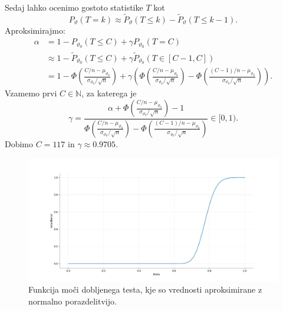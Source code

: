 \documentclass[ letterpaper, titlepage, fleqn]{article}
\newcommand{\N}{\mathbb N}
\begin{document}
Sedaj lahko ocenimo gostoto statistike $T$ kot
$$P_\vartheta(T = k) \approx \tilde{P}_\vartheta(T \leq k) - \tilde{P}_\vartheta(T \leq k-1).$$
Aproksimirajmo:
\begin{equation*}
\begin{aligned}
\alpha &= 1 - P_{\vartheta_0}(T \leq C) + \gamma P_{\vartheta_0}(T = C) \\
&\approx 1 - \tilde{P}_{\vartheta_0}(T \leq C) + \gamma \tilde{P}_{\vartheta_0}(T \in [C-1, C]) \\
&= 1 - \Phi\left(\frac{C/n - \mu_{\vartheta_0}}{\sigma_{\vartheta_0} / \sqrt{n}}\right) + \gamma\left(
\Phi\left(\frac{C/n - \mu_{\vartheta_0}}{\sigma_{\vartheta_0} / \sqrt{n}}\right) -
\Phi\left(\frac{(C-1)/n - \mu_{\vartheta_0}}{\sigma_{\vartheta_0} / \sqrt{n}}\right)
\right).
\end{aligned}
\end{equation*}
Vzamemo prvi $C\in\N$, za katerega je 
$$\gamma = \frac{\alpha +
\Phi\left(\frac{C/n - \mu_{\vartheta_0}}{\sigma_{\vartheta_0} / \sqrt{n}}\right) - 1}
{\Phi\left(\frac{C/n - \mu_{\vartheta_0}}{\sigma_{\vartheta_0} / \sqrt{n}}\right) -
\Phi\left(\frac{(C-1)/n - \mu_{\vartheta_0}}{\sigma_{\vartheta_0} / \sqrt{n}}\right)} \in [0,1).$$
Dobimo $C = 117$ in $\gamma \approx 0.9705$.
\begin{center}
\begin{figure}[h]
\includegraphics[width=18cm]{graphics/FunkcijaMoci.png}
\caption{Funkcija moči dobljenega testa, kje so vrednosti aproksimirane z normalno porazdelitvijo.}
\end{figure}
\end{center}

\section{}
\end{document}
